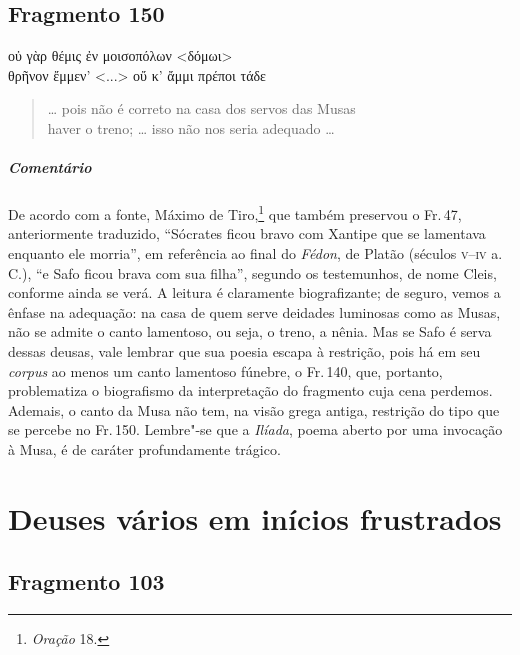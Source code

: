 \section{Fragmento 150}

\begin{gkverse}
οὐ γὰρ θέμις ἐν μοισοπόλων <δόμωι>\\
θρῆνον ἔμμεν’ <...> οὔ κ’ ἄμμι πρέποι τάδε
\end{gkverse}

\begin{verse}
\ldots{} pois não é correto na casa dos servos das Musas\\
haver o treno; \ldots{} isso não nos seria adequado \ldots{}
\end{verse}

\medskip

{\paragraph{Comentário} De acordo com a fonte, Máximo de Tiro,\footnote{\emph{Oração} 18.} que também preservou o Fr.\,47, anteriormente traduzido, ``Sócrates ficou bravo com Xantipe que se
lamentava enquanto ele morria'', em referência ao final do \emph{Fédon}, de
Platão (séculos \textsc{v--iv} a.\,C.), ``e Safo ficou brava com sua filha'', segundo os testemunhos, de
nome Cleis, conforme ainda se verá. A leitura é
claramente biografizante; de seguro, vemos a ênfase na adequação: na casa de quem serve
deidades luminosas como as Musas, não se admite o canto lamentoso, ou seja, o
treno, a nênia. Mas se Safo é serva dessas deusas, vale lembrar que sua poesia
escapa à restrição, pois há em seu \emph{corpus} ao menos um canto lamentoso
fúnebre, o Fr.\,140, que, portanto, problematiza o biografismo da interpretação
do fragmento cuja cena perdemos. Ademais, o canto da Musa não tem, na visão grega antiga, restrição 
do tipo que se percebe no Fr.\,150. Lembre"-se que a \emph{Ilíada},
poema aberto por uma invocação à Musa, é de caráter
profundamente trágico.}


\chapter{Deuses vários em inícios frustrados}


\section{Fragmento 103}

